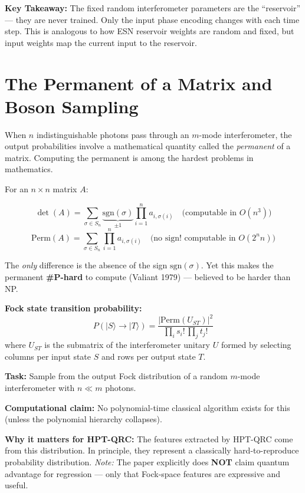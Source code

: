 \documentclass[11pt]{article}
\newcommand{\concept}[2]{%
  \begin{tcolorbox}[conceptbox, title={#1}]
  #2
  \end{tcolorbox}
}
\newcommand{\mathblock}[2]{%
  \begin{tcolorbox}[mathbox, title={Math: #1}]
  #2
  \end{tcolorbox}
}
\newcommand{\keypoint}[1]{%
  \begin{tcolorbox}[keybox]
  \textbf{Key Takeaway:} #1
  \end{tcolorbox}
}
\begin{document}
\keypoint{The fixed random interferometer parameters are the ``reservoir''
--- they are never trained. Only the input phase encoding changes with
each time step. This is analogous to how ESN reservoir weights are random
and fixed, but input weights map the current input to the reservoir.}

\section{The Permanent of a Matrix and Boson Sampling}

\concept{Why Photon Counting is Hard to Simulate Classically}{
When $n$ indistinguishable photons pass through an $m$-mode interferometer,
the output probabilities involve a mathematical quantity called the
\emph{permanent} of a matrix. Computing the permanent is among the
hardest problems in mathematics.
}

\mathblock{Permanent vs.\ Determinant}{
For an $n \times n$ matrix $A$:

\[
  \det(A)  = \sum_{\sigma \in S_n} \underbrace{\text{sgn}(\sigma)}_{\pm 1}
             \prod_{i=1}^n a_{i,\sigma(i)}
  \quad \text{(computable in } O(n^3))
\]
\[
  \text{Perm}(A) = \sum_{\sigma \in S_n}
                  \prod_{i=1}^n a_{i,\sigma(i)}
  \quad \text{(no sign! computable in } O(2^n n))
\]

The \emph{only} difference is the absence of the sign $\text{sgn}(\sigma)$.
Yet this makes the permanent \textbf{\#P-hard} to compute (Valiant 1979) ---
believed to be harder than NP.

\textbf{Fock state transition probability:}
\[
  P(|S\rangle \to |T\rangle) = \frac{|\text{Perm}(U_{ST})|^2}{\prod_i s_i!\,\prod_j t_j!}
\]
where $U_{ST}$ is the submatrix of the interferometer unitary $U$ formed
by selecting columns per input state $S$ and rows per output state $T$.
}

\concept{Boson Sampling (Aaronson-Arkhipov 2011)}{
\textbf{Task:} Sample from the output Fock distribution of a random $m$-mode
interferometer with $n \ll m$ photons.

\textbf{Computational claim:} No polynomial-time classical algorithm exists
for this (unless the polynomial hierarchy collapses).

\textbf{Why it matters for HPT-QRC:}
The features extracted by HPT-QRC come from this distribution.
In principle, they represent a classically hard-to-reproduce probability
distribution. \emph{Note:} The paper explicitly does \textbf{NOT} claim
quantum advantage for regression --- only that Fock-space features are
expressive and useful.
}
\end{document}
